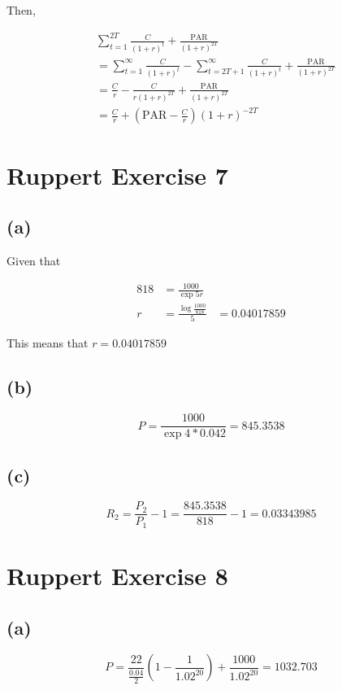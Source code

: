 \documentclass[11pt]{scrartcl}
\newcommand{\PAR}{\ensuremath{\mathrm{PAR}}}
\begin{document}
Then,

\begin{align*}
&\sum_{t=1}^{2T} \frac{C}{(1+r)^t} + \frac{\PAR}{(1+r)^{2T}} \\
&=\sum_{t=1}^\infty \frac{C}{(1+r)^t} - \sum_{t=2T+1}^\infty \frac{C}{(1+r)^t} + \frac{\PAR}{(1+r)^{2T}} \\
&= \frac{C}{r} - \frac{C}{r(1+r)^{2T}} + \frac{\PAR}{(1+r)^{2T}} \\
&= \frac{C}{r} + \left(\PAR - \frac{C}{r}\right)(1+r)^{-2T}
\end{align*}

\section*{Ruppert Exercise 7}

\subsection*{(a)}

Given that

\begin{align*}
818 &= \frac{1000}{\exp{5r}} \\
r &= \frac{\log{\frac{1000}{818}}}{5}
&= 0.04017859
\end{align*}

This means that $r = 0.04017859$

\subsection*{(b)}

\[P = \frac{1000}{\exp{4*0.042}} = 845.3538\]

\subsection*{(c)}

\[R_2 = \frac{P_2}{P_1} - 1 = \frac{845.3538}{818} - 1 = 0.03343985\]

\section*{Ruppert Exercise 8}

\subsection*{(a)}

\[P = \frac{22}{\frac{0.04}{2}}\left(1-\frac{1}{1.02^{20}}\right) + \frac{1000}{1.02^{20}} = 1032.703\]
\end{document}
